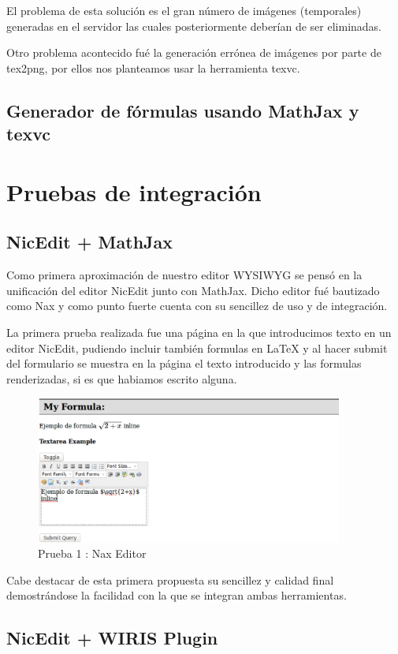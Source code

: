 El problema de esta solución es el gran número de imágenes (temporales) generadas en el servidor las cuales posteriormente deberían de ser eliminadas.

Otro problema acontecido fué la generación errónea de imágenes por parte de tex2png, por ellos nos planteamos usar la herramienta texvc.

\subsection{Generador de fórmulas usando MathJax y texvc}

\section{Pruebas de integración}
\subsection{NicEdit + MathJax}

Como primera aproximación de nuestro editor WYSIWYG se pensó en la unificación del editor NicEdit junto con MathJax. Dicho editor fué bautizado como Nax y como punto fuerte cuenta con su sencillez de uso y de integración.

La primera prueba realizada fue una página en la que introducimos texto en un editor NicEdit, pudiendo incluir también formulas en {\LaTeX} y al hacer submit del formulario se muestra en la página el texto introducido y las formulas renderizadas, si es que habiamos escrito alguna.

\begin{figure}[h!]
  \centering
      \includegraphics[width=0.9\textwidth]{fig/nax1}
  \caption{Prueba 1 : Nax Editor}
\end{figure}

Cabe destacar de esta primera propuesta su sencillez y calidad final demostrándose la facilidad con la que se integran ambas herramientas.

\subsection{NicEdit + WIRIS Plugin}
